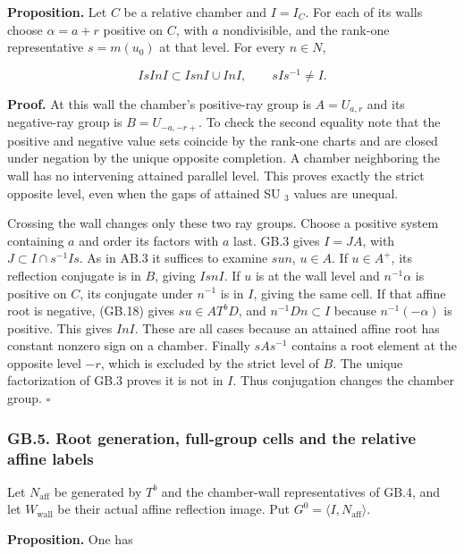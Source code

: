 \documentclass[
  11pt,
]{article}
\begin{document}
\textbf{Proposition.} Let \(C\) be a relative chamber and \(I=I_C\). For
each of its walls choose \(\alpha=a+r\) positive on \(C\), with \(a\)
nondivisible, and the rank-one representative \(s=m(u_0)\) at that
level. For every \(n\in N\),

\[
 I s I n I\subset I s n I\cup I n I,
 \qquad s I s^{-1}\ne I.
 \tag{GB.19}
\]

\textbf{Proof.} At this wall the chamber's positive-ray group is
\(A=U_{a,r}\) and its negative-ray group is \(B=U_{-a,-r+}\). To check
the second equality note that the positive and negative value sets
coincide by the rank-one charts and are closed under negation by the
unique opposite completion. A chamber neighboring the wall has no
intervening attained parallel level. This proves exactly the strict
opposite level, even when the gaps of attained SU \(_3\) values are
unequal.

Crossing the wall changes only these two ray groups. Choose a positive
system containing \(a\) and order its factors with \(a\) last. GB.3
gives \(I=J A\), with \(J\subset I\cap s^{-1}Is\). As in AB.3 it
suffices to examine \(s u n\), \(u\in A\). If \(u\in A^+\), its
reflection conjugate is in \(B\), giving \(I s n I\). If \(u\) is at the
wall level and \(n^{-1}\alpha\) is positive on \(C\), its conjugate
under \(n^{-1}\) is in \(I\), giving the same cell. If that affine root
is negative, (GB.18) gives \(s u\in A T^b D\), and
\(n^{-1}D n\subset I\) because \(n^{-1}(-\alpha)\) is positive. This
gives \(InI\). These are all cases because an attained affine root has
constant nonzero sign on a chamber. Finally \(sAs^{-1}\) contains a root
element at the opposite level \(-r\), which is excluded by the strict
level of \(B\). The unique factorization of GB.3 proves it is not in
\(I\). Thus conjugation changes the chamber group. \(\square\)

\subsubsection{GB.5. Root generation, full-group cells and the relative
affine
labels}\label{gb.5.-root-generation-full-group-cells-and-the-relative-affine-labels}

Let \(N_{\mathrm{aff}}\) be generated by \(T^b\) and the chamber-wall
representatives of GB.4, and let \(W_{\mathrm{wall}}\) be their actual
affine reflection image. Put \(G^0=\langle I,N_{\mathrm{aff}}\rangle\).

\textbf{Proposition.} One has
\end{document}
